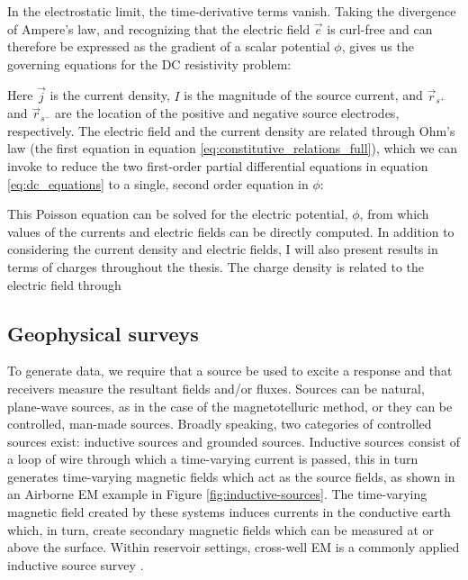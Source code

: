 In the electrostatic limit, the time-derivative terms vanish. Taking the divergence of Ampere's law, and recognizing that the electric field $\vec{e}$ is curl-free and can therefore be expressed as the gradient of a scalar potential $\phi$, gives us the governing equations for the DC resistivity problem:

Here $\vec{j}$ is the current density, $I$ is the magnitude of the source current, and $\vec{r}_{s^+}$ and $\vec{r}_{s^-}$ are the location of the positive and negative source electrodes, respectively. The electric field and the current density are related through Ohm's law (the first equation in equation \ref{eq:constitutive_relations_full}), which we can invoke to reduce the two first-order partial differential equations in equation \ref{eq:dc_equations} to a single, second order equation in $\phi$:

This Poisson equation can be solved for the electric potential, $\phi$, from which values of the currents and electric fields can be directly computed. In addition to considering the current density and electric fields, I will also present results in terms of charges throughout the thesis. The charge density is related to the electric field through


\subsection{Geophysical surveys}
To generate data, we require that a source be used to excite a response and that receivers measure the resultant fields and/or fluxes. Sources can be natural, plane-wave sources, as in the case of the magnetotelluric method, or they can be controlled, man-made sources. Broadly speaking, two categories of controlled sources exist: inductive sources and grounded sources. Inductive sources consist of a loop of wire through which a time-varying current is passed, this in turn generates time-varying magnetic fields which act as the source fields, as shown in an Airborne EM example in Figure \ref{fig:inductive-sources}. The time-varying magnetic field created by these systems induces currents in the conductive earth which, in turn, create secondary magnetic fields which can be measured at or above the surface. Within reservoir settings, cross-well EM is a commonly applied inductive source survey \citep{Wilt1995}.







